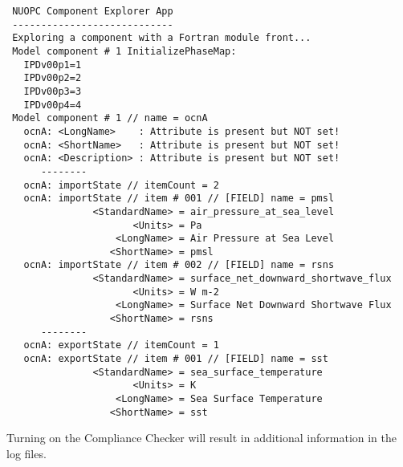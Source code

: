 \begin{verbatim}
 NUOPC Component Explorer App
 ----------------------------
 Exploring a component with a Fortran module front...
 Model component # 1 InitializePhaseMap:
   IPDv00p1=1
   IPDv00p2=2
   IPDv00p3=3
   IPDv00p4=4
 Model component # 1 // name = ocnA
   ocnA: <LongName>    : Attribute is present but NOT set!
   ocnA: <ShortName>   : Attribute is present but NOT set!
   ocnA: <Description> : Attribute is present but NOT set!
      --------
   ocnA: importState // itemCount = 2
   ocnA: importState // item # 001 // [FIELD] name = pmsl
               <StandardName> = air_pressure_at_sea_level
                      <Units> = Pa
                   <LongName> = Air Pressure at Sea Level
                  <ShortName> = pmsl
   ocnA: importState // item # 002 // [FIELD] name = rsns
               <StandardName> = surface_net_downward_shortwave_flux
                      <Units> = W m-2
                   <LongName> = Surface Net Downward Shortwave Flux
                  <ShortName> = rsns
      --------
   ocnA: exportState // itemCount = 1
   ocnA: exportState // item # 001 // [FIELD] name = sst
               <StandardName> = sea_surface_temperature
                      <Units> = K
                   <LongName> = Sea Surface Temperature
                  <ShortName> = sst
\end{verbatim}

Turning on the Compliance Checker will result in additional information in the log files.







